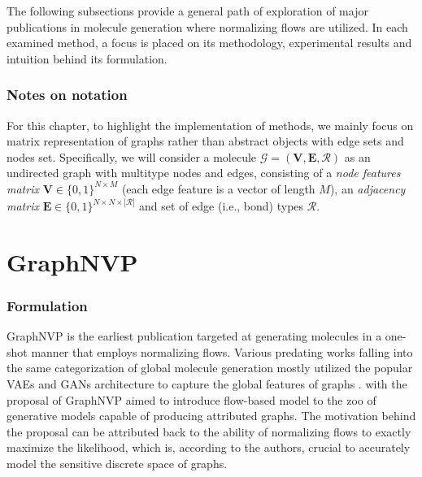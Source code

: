 The following subsections provide a general path of exploration of major
publications in molecule generation where normalizing flows are utilized. In
each examined method, a focus is placed on its methodology, experimental results
and intuition behind its formulation.

\subsubsection{Notes on notation}

For this chapter, to highlight the implementation of methods, we mainly focus on
matrix representation of graphs rather than abstract objects with edge sets and
nodes set. Specifically, we will consider a molecule $\mathcal{G} =
(\mathbf{V},\mathbf{E}, \mathcal{R})$ as an undirected graph with multitype
nodes and edges, consisting of a \textit{node features matrix} $\mathbf{V} \in
\{0,1\}^{N \times M}$ (each edge feature is a vector of length $M$), an
\textit{adjacency matrix} $\mathbf{E} \in \{0,1\}^{N \times N \times
|\mathcal{R}|}$ and set of edge (i.e., bond) types $\mathcal{R}$.

\section{GraphNVP}

\subsubsection{Formulation}

GraphNVP is the earliest publication targeted at generating molecules in a
one-shot manner that employs normalizing flows. Various predating works falling
into the same categorization of global molecule generation mostly utilized the
popular VAEs and GANs architecture to capture the global features of graphs
\citep{maConstrainedGenerationSemantically2018,
liuConstrainedGraphVariational2018, decaoMolGANImplicitGenerative2018}.
\citep{madhawaGraphNVPInvertibleFlow2019} with the proposal of GraphNVP aimed to
introduce flow-based model to the zoo of generative models capable of producing
attributed graphs. The motivation behind the proposal can be attributed back to
the ability of normalizing flows to exactly maximize the likelihood, which is,
according to the authors, crucial to accurately model the sensitive discrete
space of graphs.

